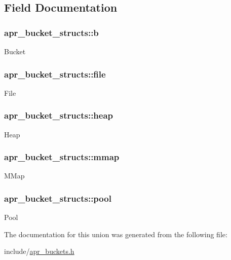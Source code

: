 \subsection{Field Documentation}
\hypertarget{unionapr__bucket__structs_a840c42a20727de2e4534ca05f1f6c990}{
\subsubsection[{b}]{ apr\-\_\-bucket\-\_\-structs\-::b}}\label{unionapr__bucket__structs_a840c42a20727de2e4534ca05f1f6c990}
Bucket \hypertarget{unionapr__bucket__structs_ab339255acdf750133759a0d67b3f2e30}{
\subsubsection[{file}]{ apr\-\_\-bucket\-\_\-structs\-::file}}\label{unionapr__bucket__structs_ab339255acdf750133759a0d67b3f2e30}
File \hypertarget{unionapr__bucket__structs_a5335dc82d8250e511a9c55e5fea97141}{
\subsubsection[{heap}]{ apr\-\_\-bucket\-\_\-structs\-::heap}}\label{unionapr__bucket__structs_a5335dc82d8250e511a9c55e5fea97141}
Heap \hypertarget{unionapr__bucket__structs_a627c4ca697f06bbf4226c8c2acd93cbc}{
\subsubsection[{mmap}]{ apr\-\_\-bucket\-\_\-structs\-::mmap}}\label{unionapr__bucket__structs_a627c4ca697f06bbf4226c8c2acd93cbc}
M\-Map \hypertarget{unionapr__bucket__structs_ab926fe2af7c1780c03bf1669766db4a1}{
\subsubsection[{pool}]{ apr\-\_\-bucket\-\_\-structs\-::pool}}\label{unionapr__bucket__structs_ab926fe2af7c1780c03bf1669766db4a1}
Pool 

The documentation for this union was generated from the following file\-:\begin{DoxyCompactItemize}
\item 
include/\hyperlink{apr__buckets_8h}{apr\-\_\-buckets.\-h}\end{DoxyCompactItemize}
